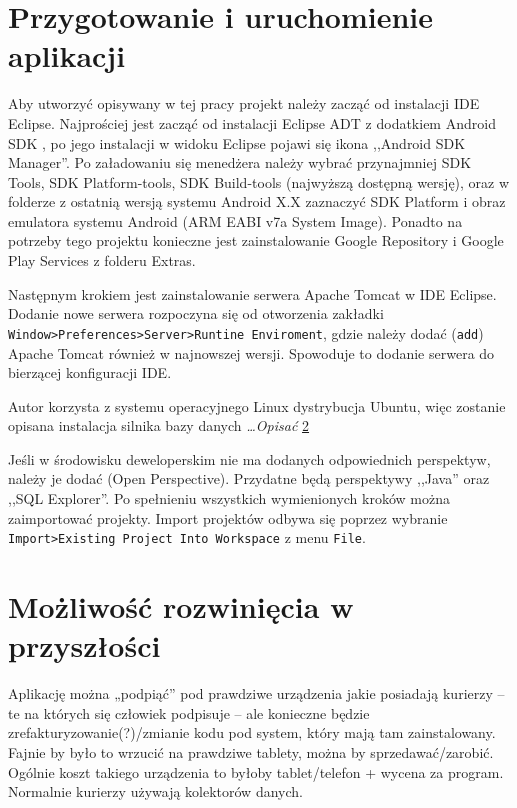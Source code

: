 \documentclass[eng,printmode,oneside]{mgr}
\begin{document}
\chapter{Przygotowanie i uruchomienie aplikacji}

Aby utworzyć opisywany w tej pracy projekt należy zacząć od instalacji IDE
Eclipse. Najprościej jest zacząć od instalacji Eclipse ADT z dodatkiem Android
SDK \cite{eclipse}, po jego instalacji w widoku Eclipse pojawi się ikona
,,Android SDK Manager''. Po załadowaniu się menedżera należy wybrać przynajmniej
SDK Tools, SDK Platform-tools, SDK Build-tools (najwyższą dostępną wersję), oraz w folderze z ostatnią wersją systemu Android X.X zaznaczyć SDK Platform i
obraz emulatora systemu Android (ARM EABI v7a System Image). Ponadto na
potrzeby tego projektu konieczne jest zainstalowanie Google Repository i Google
Play Services z folderu Extras.

Następnym krokiem jest zainstalowanie serwera Apache Tomcat w IDE Eclipse.
Dodanie nowe serwera rozpoczyna się od otworzenia zakładki
\texttt{Window>Preferences>Server>Runtine Enviroment}, gdzie należy dodać
(\texttt{add}) Apache Tomcat również w najnowszej wersji. Spowoduje to
dodanie serwera do bierzącej konfiguracji IDE.

Autor korzysta z systemu operacyjnego Linux dystrybucja Ubuntu, więc zostanie
opisana instalacja silnika bazy danych \emph{\color{komentarz}\ldots Opisać}
\ref{}

Jeśli w środowisku deweloperskim nie ma dodanych odpowiednich perspektyw,
należy je dodać (Open Perspective). Przydatne będą perspektywy
,,Java'' oraz ,,SQL Explorer''.
Po spełnieniu wszystkich wymienionych kroków można zaimportować
projekty. Import projektów odbywa się poprzez wybranie
\texttt{Import>Existing Project Into Workspace} z menu \texttt{File}.

\chapter{Możliwość rozwinięcia w przyszłości}
Aplikację można „podpiąć” pod prawdziwe urządzenia jakie posiadają kurierzy – te
na których się człowiek podpisuje – ale konieczne będzie
zrefakturyzowanie(?)/zmianie kodu pod system, który mają tam zainstalowany.
	Fajnie by było to wrzucić na prawdziwe tablety, można by sprzedawać/zarobić.
	Ogólnie koszt takiego urządzenia to byłoby tablet/telefon + wycena za program.
	Normalnie kurierzy używają kolektorów danych.
	
\end{document}
